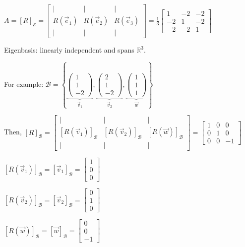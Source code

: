 \documentclass[11pt,fleqn]{book} %
\begin{document}
$A=[R]_\mathcal{E} = \begin{bmatrix} | &| &| \\ R(\vec{e}_1) &R(\vec{e}_2) &R(\vec{e}_3) \\ | &| &| \end{bmatrix} = \frac{1}{3}\begin{bmatrix} 1 &-2 &-2 \\ -2 &1 &-2 \\ -2 &-2 &1 \end{bmatrix}$

Eigenbasis: linearly independent and spans $\mathbb{R}^3$.

For example: $\mathcal{B} = \left\{
\underbrace{ \begin{pmatrix} 1\\1\\-2 \end{pmatrix} }_{\vec{v}_1},
\underbrace{ \begin{pmatrix} 2\\1\\-2 \end{pmatrix} }_{\vec{v}_2},
\underbrace{ \begin{pmatrix} 1\\1\\1 \end{pmatrix} }_{\vec{w}}
\right\}$

Then, $[R]_\mathcal{B} =
\begin{bmatrix} | &| &| \\ [R(\vec{v}_1)]_\mathcal{B} &[R(\vec{v}_2)]_\mathcal{B} &[R(\vec{w})]_\mathcal{B} \\ | &| &| \end{bmatrix} = \begin{bmatrix} 1 &0 &0 \\ 0 &1 &0 \\ 0 &0 &-1 \end{bmatrix}$

$[R(\vec{v}_1)]_\mathcal{B} = [\vec{v}_1]_\mathcal{B} = \begin{bmatrix} 1\\0\\0 \end{bmatrix}$

$[R(\vec{v}_2)]_\mathcal{B} = [\vec{v}_2]_\mathcal{B}=\begin{bmatrix} 0\\1\\0 \end{bmatrix}$

$[R(\vec{w})]_\mathcal{B} = [\vec{w}]_\mathcal{B}=\begin{bmatrix} 0\\0\\-1 \end{bmatrix}$
\end{document}
